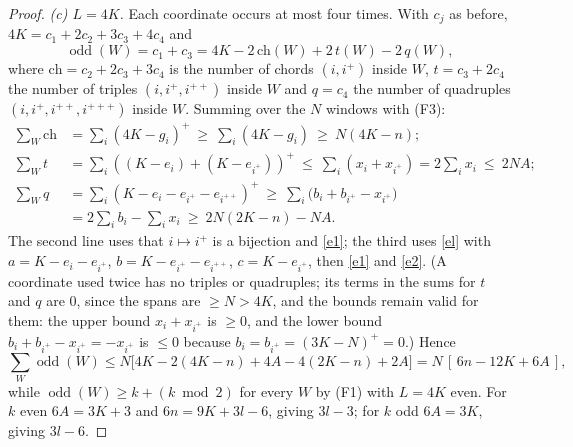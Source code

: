 \documentclass[11pt]{article}
\theoremstyle{remark}
\newcommand{\odd}{\operatorname{odd}}
\newcommand{\pos}[1]{(#1)^{+}}
\begin{document}
\begin{proof}
\emph{(c) $L=4K$.} Each coordinate occurs at most four times. With $c_j$ as before,
$4K=c_1+2c_2+3c_3+4c_4$ and
\[ \odd(W)=c_1+c_3=4K-2\,\mathrm{ch}(W)+2\,t(W)-2\,q(W), \]
where $\mathrm{ch}=c_2+2c_3+3c_4$ is the number of chords $(i,i^+)$ inside $W$, $t=c_3+2c_4$ the number of triples
$(i,i^+,i^{++})$ inside $W$ and $q=c_4$ the number of quadruples $(i,i^+,i^{++},i^{+++})$ inside $W$. Summing over the $N$ windows with (F3):
\begin{align*}
\sum_W\mathrm{ch}&=\sum_i\pos{4K-g_i}\ \ge\ \sum_i(4K-g_i)\ \ge\ N(4K-n);\\
\sum_Wt&=\sum_i\pos{(K-e_i)+(K-e_{i^+})}\ \le\ \sum_i(x_i+x_{i^+})=2\sum_ix_i\ \le\ 2NA;\\
\sum_Wq&=\sum_i\pos{K-e_i-e_{i^+}-e_{i^{++}}}\ \ge\ \sum_i\bigl(b_i+b_{i^+}-x_{i^+}\bigr)\\ &=2\sum_ib_i-\sum_ix_i\ \ge\ 2N(2K-n)-NA.
\end{align*}
The second line uses that $i\mapsto i^+$ is a bijection and \eqref{e1}; the third uses \eqref{el} with
$a=K-e_i-e_{i^+}$, $b=K-e_{i^+}-e_{i^{++}}$, $c=K-e_{i^+}$, then \eqref{e1} and \eqref{e2}.
(A coordinate used twice has no triples or quadruples; its terms in the sums for $t$ and $q$ are $0$, since the spans are
$\ge N>4K$, and the bounds remain valid for them: the upper bound $x_i+x_{i^+}$ is $\ge 0$, and the lower bound
$b_i+b_{i^+}-x_{i^+}=-x_{i^+}$ is $\le 0$ because $b_i=b_{i^+}=\pos{3K-N}=0$.) Hence
\[ \sum_W\odd(W)\le N\bigl[4K-2(4K-n)+4A-4(2K-n)+2A\bigr]=N\,[\,6n-12K+6A\,], \]
while $\odd(W)\ge k+(k\bmod 2)$ for every $W$ by (F1) with $L=4K$ even.
For $k$ even $6A=3K+3$ and $6n=9K+3l-6$, giving $3l-3$; for $k$ odd $6A=3K$, giving $3l-6$.
\end{proof}
\end{document}
